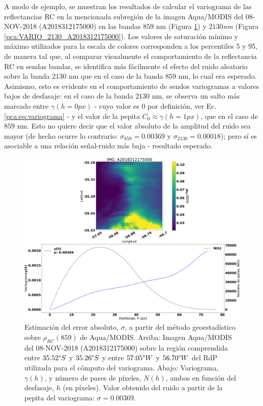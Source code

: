             A modo de ejemplo, se muestran los resultados de calcular el variograma de las reflectancias RC en la mencionada subregión de la imagen Aqua/MODIS del 08-NOV-2018 (A2018312175000) en las bandas $859$ nm (Figura \ref{pca:VARIO_859_A2018312175000}) y $2130$\textit{nm} (Figura \ref{pca:VARIO_2130_A2018312175000}). Los valores de saturación mínimo y máximo utilizados para la escala de colores corresponden a los percentiles 5 y 95, de manera tal que, al comparar visualmente el comportamiento de la reflectancia RC en sendas bandas, se identifica más fácilmente el efecto del ruido aleatorio sobre la banda $2130$ nm que en el caso de la banda $859$ nm, lo cual era esperado. Asimismo, esto es evidente en el comportamiento de sendos variogramas a valores bajos de desfasaje: en el caso de la banda $2130$ nm, se observa un salto más marcado entre $\gamma(h=0px)$ - cuyo valor es 0 por definición, ver Ec. \ref{pca:eq:variograma} - y el valor de la pepita $C_{0} \approx \gamma(h=1 px)$, que en el caso de $859$ nm. Esto no quiere decir que el valor absoluto de la amplitud del ruido sea mayor (de hecho ocurre lo contrario: $\sigma_{859} = 0.00369$ y $\sigma_{2130} = 0.00018$); pero sí es asociable a una relación señal-ruido más baja - resultado esperado.

            \begin{figure}
            \centering
            \includegraphics[width=\textwidth]{pca/figures/VARIO_859_A2018312175000.png}
            \caption[Estimación del error absoluto, $\sigma$, a partir del método geoestadístico sobre $\rho_{RC}(859)$ de Aqua/MODIS.]{Estimación del error absoluto, $\sigma$, a partir del método geoestadístico sobre $\rho_{RC}(859)$ de Aqua/MODIS. Arriba: Imagen Aqua/MODIS del 08-NOV-2018 (A2018312175000) sobre la región comprendida entre $35.52\degree S$ y $35.26\degree S$ y entre $57.05\degree W$ y $56.70\degree W$ del RdP utilizada para el cómputo del variograma. Abajo: Variograma, $\gamma(h)$, y número de pares de píxeles, $N(h)$, ambos en función del desfasaje, $h$ (en píxeles). Valor obtenido del ruido a partir de la pepita del variograma: $\sigma = 0.00369$.}
            \label{pca:VARIO_859_A2018312175000}
            \end{figure}
    
